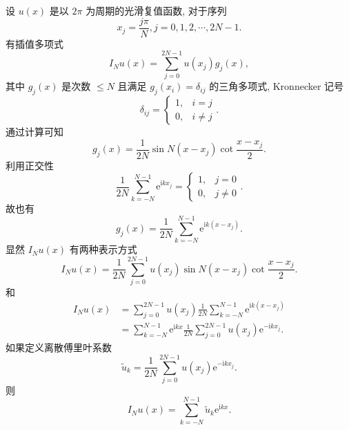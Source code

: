 设 $u(x)$ 是以 $2 \pi$ 为周期的光滑复值函数, 对于序列
\begin{equation}
x_j=\frac{j \pi}{N}, j=0,1,2, \cdots, 2 N-1.
\end{equation}
有插值多项式
\begin{equation}
I_N u(x)=\sum_{j=0}^{2 N-1} u\left(x_j\right) g_j(x),\label{eq:FT1}
\end{equation}
其中 $g_j(x)$ 是次数 $\leq N$ 且满足 $g_j\left(x_i\right)=\delta_{i j}$ 的三角多项式, 
Kronnecker 记号
\begin{equation}
\delta_{i j}= \begin{cases}1, & i=j \\ 0, & i \neq j\end{cases}
.\end{equation}
通过计算可知
\begin{equation}
g_j(x)=\frac{1}{2 N} \sin N\left(x-x_j\right) \cot \frac{x-x_j}{2}.
\end{equation}
利用正交性
\begin{equation}
\frac{1}{2 N} \sum_{k=-N}^{N-1} \mathrm{e}^{\mathrm{i} k x_j}= \begin{cases}1, & j=0 \\ 0, & j \neq 0\end{cases}.
\end{equation}
故也有
\begin{equation}
g_j(x)=\frac{1}{2 N} \sum_{k=-N}^{N-1} \mathrm{e}^{\mathrm{i} k\left(x-x_j\right)}.
\end{equation}
显然 $I_N u(x)$ 有两种表示方式
\begin{equation}
I_N u(x)=\frac{1}{2 N} \sum_{j=0}^{2 N-1} u\left(x_j\right) \sin N\left(x-x_j\right) \cot \frac{x-x_j}{2}.
\end{equation}
和
\begin{equation}
\begin{aligned}
I_N u(x)&=\sum_{j=0}^{2 N-1} u\left(x_j\right) \frac{1}{2 N} \sum_{k=-N}^{N-1} \mathrm{e}^{\mathrm{i} k\left(x-x_j\right)} \\
&=\sum_{k=-N}^{N-1} \mathrm{e}^{\mathrm{i} k x} \frac{1}{2 N} \sum_{j=0}^{2 N-1} u\left(x_j\right) \mathrm{e}^{-\mathrm{i} k x_j}.
\end{aligned}
\end{equation}
如果定义离散傅里叶系数
\begin{equation}
\tilde{u}_k=\frac{1}{2 N} \sum_{j=0}^{2 N-1} u\left(x_j\right) \mathrm{e}^{-\mathrm{i} k x_j}.
\end{equation}
则
\begin{equation}
I_N u(x)=\sum_{k=-N}^{N-1} \tilde{u}_k \mathrm{e}^{\mathrm{i} k x}.
\end{equation}

